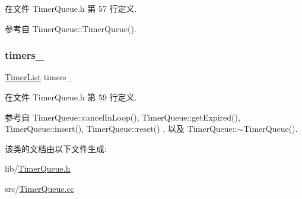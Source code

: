 在文件 Timer\+Queue.\+h 第 57 行定义.



参考自 Timer\+Queue\+::\+Timer\+Queue().

\mbox{\label{classmuduo_1_1TimerQueue_a8fe653e82ce7b6c7135163d91a8a7602}} 
\subsubsection{\texorpdfstring{timers\+\_\+}{timers\_}}
{\footnotesize\ttfamily \hyperlink{classmuduo_1_1TimerQueue_aeb83ff8eddb4b17cb88a9c3dab7268a2}{Timer\+List} timers\+\_\+\hspace{0.3cm}{\ttfamily [private]}}



在文件 Timer\+Queue.\+h 第 59 行定义.



参考自 Timer\+Queue\+::cancel\+In\+Loop(), Timer\+Queue\+::get\+Expired(), Timer\+Queue\+::insert(), Timer\+Queue\+::reset() , 以及 Timer\+Queue\+::$\sim$\+Timer\+Queue().



该类的文档由以下文件生成\+:\begin{DoxyCompactItemize}
\item 
lib/\hyperlink{TimerQueue_8h}{Timer\+Queue.\+h}\item 
src/\hyperlink{TimerQueue_8cc}{Timer\+Queue.\+cc}\end{DoxyCompactItemize}
